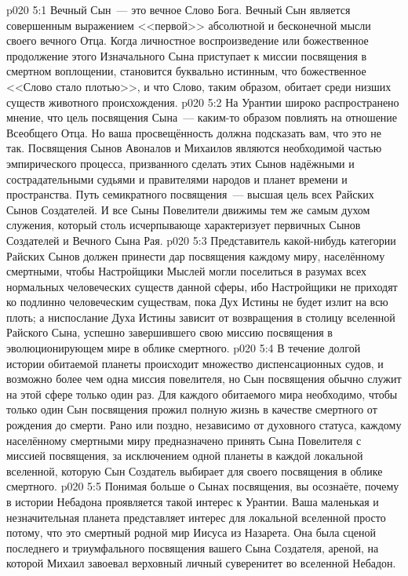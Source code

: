 \vs p020 5:1 Вечный Сын~--- это вечное Слово Бога. Вечный Сын является совершенным выражением <<первой>> абсолютной и бесконечной мысли своего вечного Отца. Когда личностное воспроизведение или божественное продолжение этого Изначального Сына приступает к миссии посвящения в смертном воплощении, становится буквально истинным, что божественное <<Слово стало плотью>>, и что Слово, таким образом, обитает среди низших существ животного происхождения.
\vs p020 5:2 На Урантии широко распространено мнение, что цель посвящения Сына~--- каким\hyp{}то образом повлиять на отношение Всеобщего Отца. Но ваша просвещённость должна подсказать вам, что это не так. Посвящения Сынов Авоналов и Михаилов являются необходимой частью эмпирического процесса, призванного сделать этих Сынов надёжными и сострадательными судьями и правителями народов и планет времени и пространства. Путь семикратного посвящения~--- высшая цель всех Райских Сынов Создателей. И все Сыны Повелители движимы тем же самым духом служения, который столь исчерпывающе характеризует первичных Сынов Создателей и Вечного Сына Рая.
\vs p020 5:3 Представитель какой\hyp{}нибудь категории Райских Сынов должен принести дар посвящения каждому миру, населённому смертными, чтобы Настройщики Мыслей могли поселиться в разумах всех нормальных человеческих существ данной сферы, ибо Настройщики не приходят ко  подлинно человеческим существам, пока Дух Истины не будет излит на всю плоть; а ниспослание Духа Истины зависит от возвращения в столицу вселенной Райского Сына, успешно завершившего свою миссию посвящения в эволюционирующем мире в облике смертного.
\vs p020 5:4 В течение долгой истории обитаемой планеты происходит множество диспенсационных судов, и возможно более чем одна миссия повелителя, но Сын посвящения обычно служит на этой сфере только один раз. Для каждого обитаемого мира необходимо, чтобы только один Сын посвящения прожил полную жизнь в качестве смертного от рождения до смерти. Рано или поздно, независимо от духовного статуса, каждому населённому смертными миру предназначено принять Сына Повелителя с миссией посвящения, за исключением одной планеты в каждой локальной вселенной, которую Сын Создатель выбирает для своего посвящения в облике смертного.
\vs p020 5:5 \pc Понимая больше о Сынах посвящения, вы осознаёте, почему в истории Небадона проявляется такой интерес к Урантии. Ваша маленькая и незначительная планета представляет интерес для локальной вселенной просто потому, что это смертный родной мир Иисуса из Назарета. Она была сценой последнего и триумфального посвящения вашего Сына Создателя, ареной, на которой Михаил завоевал верховный личный суверенитет во вселенной Небадон.
